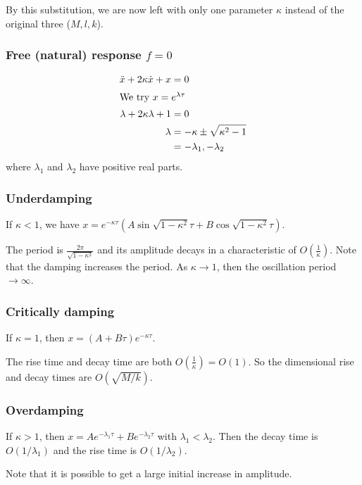 \documentclass[a4paper]{article}
\begin{document}
  By this substitution, we are now left with only one parameter $\kappa$ instead of the original three ($M, l, k$).

  \subsubsection{Free (natural) response \texorpdfstring{$f = 0$}{f = 0}}
  \begin{align*}
    \ddot x + 2\kappa \dot x + x &= 0\\
    \intertext{We try $x = e^{\lambda \tau}$}
    \lambda + 2\kappa\lambda + 1 &= 0\\
    \lambda &= -\kappa \pm \sqrt{\kappa^2 - 1}\\
    &= -\lambda_1, -\lambda_2
  \end{align*}
  where $\lambda_1$ and $\lambda_2$ have positive real parts.

  \subsubsection{Underdamping}

  If $\kappa < 1$, we have $x = e^{-\kappa\tau}(A\sin \sqrt{1 - \kappa^2}\tau  +B\cos \sqrt{1 - \kappa^2}\tau)$.

  The period is $\frac{2\pi}{\sqrt{1 - \kappa^2}}$ and its amplitude decays in a characteristic of $O(\frac{1}{\kappa})$. Note that the damping increases the period. As $\kappa \to 1$, then the oscillation period $\to \infty$.

  \subsubsection{Critically damping}
  If $\kappa = 1$, then $x = (A + B\tau)e^{-\kappa\tau}$.

  The rise time and decay time are both $O(\frac{1}{\kappa}) = O(1)$. So the dimensional rise and decay times are $O(\sqrt{M/k})$.


  \subsubsection{Overdamping}
  If $\kappa > 1$, then $x = Ae^{-\lambda_1\tau} + Be^{-\lambda_2\tau}$ with $\lambda_1 < \lambda_2$. Then the decay time is $O(1/\lambda_1)$ and the rise time is $O(1/\lambda_2)$.

  Note that it is possible to get a large initial increase in amplitude.
\end{document}
